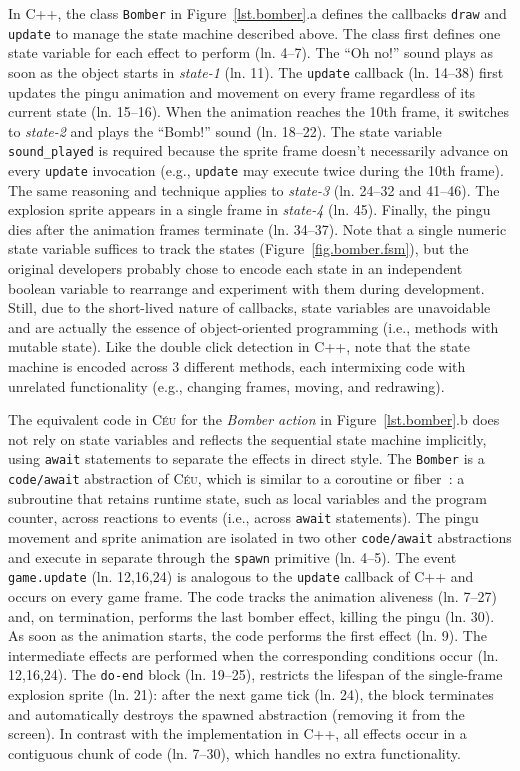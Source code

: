 \documentclass{vgtc}                          %
\newcommand{\CEU}{\textsc{C\'{e}u}\xspace}
\newcommand{\code}[1] {{\small{\texttt{#1}}}}
\begin{document}
In C++, the class \code{Bomber} in Figure~\ref{lst.bomber}.a defines the
callbacks \code{draw} and \code{update} to manage the state machine described
above.
%
The class first defines one state variable for each effect to perform
(ln. 4--7).
The ``Oh no!'' sound plays as soon as the object starts in \emph{state-1} 
(ln. 11).
The \code{update} callback (ln. 14--38) first updates the pingu animation and
movement on every frame regardless of its current state (ln. 15--16).
When the animation reaches the 10th frame, it switches to \emph{state-2} and
plays the ``Bomb!'' sound (ln. 18--22).
The state variable \code{sound\_played} is required because the sprite frame
doesn't necessarily advance on every \code{update} invocation (e.g.,
\code{update} may execute twice during the 10th frame).
The same reasoning and technique applies to \emph{state-3} (ln. 24--32 and
41--46).
The explosion sprite appears in a single frame in \emph{state-4} (ln. 45).
Finally, the pingu dies after the animation frames terminate (ln. 34--37).
%
Note that a single numeric state variable suffices to track the states
(Figure~\ref{fig.bomber.fsm}), but the original developers probably chose to
encode each state in an independent boolean 
variable to rearrange and experiment with them during development.
Still, due to the short-lived nature of callbacks, state variables are 
unavoidable and are actually the essence of object-oriented programming
(i.e., methods with mutable state).
%
Like the double click detection in C++, note that the state machine is encoded
across 3 different methods, each intermixing code with unrelated functionality
(e.g., changing frames, moving, and redrawing).

The equivalent code in \CEU for the \emph{Bomber action} in
Figure~\ref{lst.bomber}.b does not rely on state variables and reflects the
sequential state machine implicitly, using \code{await} statements to separate
the effects in direct style.
%
The \code{Bomber} is a \code{code/await} abstraction of \CEU, which is similar
to a coroutine or fiber~\cite{sync_async.cooperative}: a subroutine that
retains runtime state, such as local variables and the program counter, across
reactions to events (i.e., across \code{await} statements).
The pingu movement and sprite animation are isolated in two other
\code{code/await} abstractions and execute in separate through the \code{spawn}
primitive (ln. 4--5).
The event \code{game.update} (ln. 12,16,24) is analogous to the \code{update}
callback of C++ and occurs on every game frame.
%
The code tracks the animation aliveness (ln. 7--27) and, on termination,
performs the last bomber effect, killing the pingu (ln. 30).
As soon as the animation starts, the code performs the first effect (ln. 9).
The intermediate effects are performed when the corresponding conditions occur
(ln. 12,16,24).
The \code{do-end} block (ln. 19--25), restricts the lifespan of the
single-frame explosion sprite (ln. 21): after the next game tick (ln. 24), the
block terminates and automatically destroys the spawned abstraction (removing
it from the screen).
%
In contrast with the implementation in C++, all effects occur in a contiguous
chunk of code (ln. 7--30), which handles no extra functionality.
\end{document}
